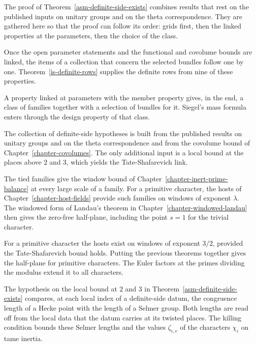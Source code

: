 The proof of Theorem~\ref{asm-definite-side-exists} combines results that rest
on the published inputs on unitary groups and on the theta correspondence. They
are gathered here so that the proof can follow its order: grids first, then
the linked properties at the parameters, then the choice of the class.

Once the open parameter statements and the functional and covolume bounds are
linked, the items of a collection that concern the selected bundles follow one
by one. Theorem~\ref{is-definite-rows} supplies the definite rows from nine of
these properties.

A property linked at parameters with the member property gives, in the end, a
class of families together with a selection of bundles for it. Siegel's mass
formula enters through the design property of that class.

The collection of definite-side hypotheses is built from the published
results on unitary groups and on the theta correspondence and from the
covolume bound of Chapter~\ref{chapter-covolumes}. The only additional input
is a local bound at the places above $2$ and $3$, which yields the
Tate-Shafarevich link.

The tied families give the window bound of
Chapter~\ref{chapter-inert-prime-balance} at every large scale of a family.
For a primitive character, the hosts of Chapter~\ref{chapter-host-fields}
provide such families on windows of exponent $\lambda$. The windowed form of
Landau's theorem in Chapter~\ref{chapter-windowed-landau} then gives the
zero-free half-plane, including the point $s=1$ for the trivial character.

For a primitive character the hosts exist on windows of exponent $3/2$,
provided the Tate-Shafarevich bound holds. Putting the previous theorems
together gives the half-plane for primitive characters. The Euler factors at
the primes dividing the modulus extend it to all characters.

The hypothesis on the local bound at $2$ and $3$ in
Theorem~\ref{asm-definite-side-exists} compares, at each local index of a
definite-side datum, the congruence length of a Hecke point with the length of
a Selmer group. Both lengths are read off from the local data that the datum
carries at its twisted places. The killing condition bounds these Selmer
lengths and the values $\zeta_{i,v}$ of the characters $\chi_i$ on tame
inertia.

